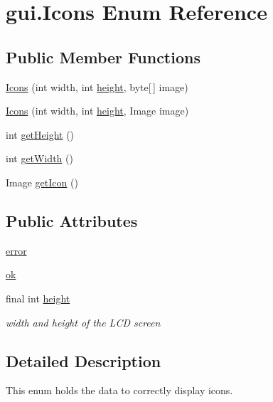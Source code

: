 \hypertarget{enumgui_1_1_icons}{\section{gui.\-Icons Enum Reference}
\label{enumgui_1_1_icons}
}
\subsection*{Public Member Functions}
\begin{DoxyCompactItemize}
\item 
\hyperlink{enumgui_1_1_icons_a3e528533a33f4e19655964c9fb373233}{Icons} (int width, int \hyperlink{enumgui_1_1_icons_ab11bc7ed7ac3f7f753226daf6ac6140f}{height}, byte\mbox{[}$\,$\mbox{]} image)
\item 
\hyperlink{enumgui_1_1_icons_a0f3a8a468a64e2145056c98892b2de78}{Icons} (int width, int \hyperlink{enumgui_1_1_icons_ab11bc7ed7ac3f7f753226daf6ac6140f}{height}, Image image)
\item 
int \hyperlink{enumgui_1_1_icons_a917db1f6862d2b3d82237fe6e26090a8}{get\-Height} ()
\item 
int \hyperlink{enumgui_1_1_icons_a7e75cc7502501bcb8a563be8b2267059}{get\-Width} ()
\item 
Image \hyperlink{enumgui_1_1_icons_a1a26d2246776c9dee0f3c6096a4c9fdb}{get\-Icon} ()
\end{DoxyCompactItemize}
\subsection*{Public Attributes}
\begin{DoxyCompactItemize}
\item 
\hyperlink{enumgui_1_1_icons_a0b529bf48d5bf3badfd0eba09a358624}{error}
\item 
\hyperlink{enumgui_1_1_icons_aceb024739dd25e6f81049f3a9eaa02e1}{ok}
\item 
final int \hyperlink{enumgui_1_1_icons_ab11bc7ed7ac3f7f753226daf6ac6140f}{height}
\begin{DoxyCompactList}\small\item\em width and height of the L\-C\-D screen \end{DoxyCompactList}\end{DoxyCompactItemize}


\subsection{Detailed Description}
This enum holds the data to correctly display icons.

